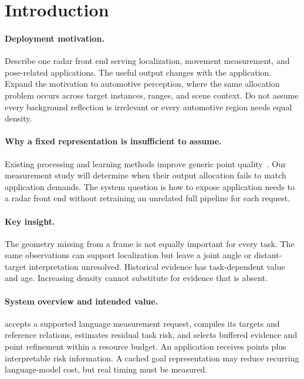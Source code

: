 \section{Introduction}
\label{sec:introduction}
\paragraph{Deployment motivation.}
Describe one radar front end serving localization, movement measurement, and pose-related applications. The useful output changes with the application. Expand the motivation to automotive perception, where the same allocation problem occurs across target instances, ranges, and scene context. Do not assume every background reflection is irrelevant or every automotive region needs equal density.

\paragraph{Why a fixed representation is insufficient to assume.}
Existing processing and learning methods improve generic point quality~\cite{mmpc2025,omnipc2026,rald2026,mmwaveflow2026}. Our measurement study will determine when their output allocation fails to match application demands. The system question is how to expose application needs to a radar front end without retraining an unrelated full pipeline for each request.

\paragraph{Key insight.}
The geometry missing from a frame is not equally important for every task. The same observations can support localization but leave a joint angle or distant-target interpretation unresolved. Historical evidence has task-dependent value and age. Increasing density cannot substitute for evidence that is absent.

\paragraph{System overview and intended value.}
\TaskRadar{} accepts a supported language measurement request, compiles its targets and reference relations, estimates residual task risk, and selects buffered evidence and point refinement within a resource budget. An application receives points plus interpretable risk information. A cached goal representation may reduce recurring language-model cost, but real timing must be measured.

